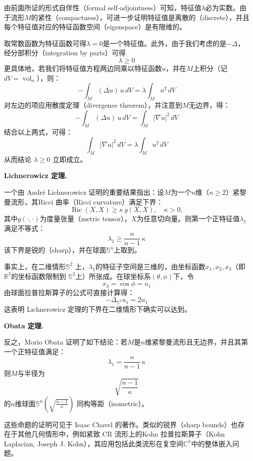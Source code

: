 由前面所证的形式自伴性（formal self-adjointness）可知，特征值$\lambda$必为实数。由于流形$M$的紧性（compactness），可进一步证明特征值是离散的（discrete），并且每个特征值对应的特征函数空间（eigenspace）是有限维的。

取常数函数为特征函数可得$\lambda = 0$是一个特征值。此外，由于我们考虑的是$-\Delta$，经分部积分（integration by parts）可得
\[
\lambda \ge 0~
\]
更具体地，若我们将特征值方程两边同乘以特征函数$u$，并在$M$上积分（记$dV = \operatorname{vol}_{n}$），则：
\[
-\int_{M} (\Delta u)\, u\, dV = \lambda \int_{M} u^{2}\, dV~
\]
对左边的项应用散度定理（divergence theorem），并注意到$M$无边界，得：
\[
-\int_{M} (\Delta u)\, u\, dV = \int_{M} |\nabla u|^{2}\, dV~
\]
结合以上两式，可得：
\[
\int_{M} |\nabla u|^{2}\, dV = \lambda \int_{M} u^{2}\, dV~
\]
从而结论 $\lambda \ge 0$ 立即成立。

\textbf{Lichnerowicz 定理.}

一个由 André Lichnerowicz 证明的重要结果指出：设$M$为一个$n$维（$n \ge 2$）紧黎曼流形，其Ricci 曲率（Ricci curvature）满足下界：
\[
\operatorname{Ric}(X, X) \ge \kappa\, g(X, X), \quad \kappa > 0,~
\]
其中$g(\cdot, \cdot)$为度量张量（metric tensor），$X$为任意切向量。则第一个正特征值$\lambda_{1}$满足不等式：
\[
\lambda_{1} \ge \frac{n}{n-1}\, \kappa~
\]
该下界是锐的（sharp），并在球面$\mathbb{S}^{n}$上取到。

事实上，在二维情形$\mathbb{S}^{2}$ 上，$\lambda_{1}$的特征子空间是三维的，由坐标函数$x_{1}, x_{2}, x_{3}$（即$\mathbb{R}^{3}$的坐标函数限制到 $\mathbb{S}^{2}$上）所张成。在球坐标系$(\theta, \phi)$下，令
\[
x_{3} = \cos \phi = u_{1}~
\]
由球面拉普拉斯算子的公式可直接计算得：
\[
-\Delta_{\mathbb{S}^{2}} u_{1} = 2u_{1}~
\]
这表明 Lichnerowicz 定理的下界在二维情形下确实可以达到。

\textbf{Obata 定理.}

反之，Morio Obata 证明了如下结论：若$M$是$n$维紧黎曼流形且无边界，并且其第一个正特征值满足：
\[
\lambda_{1} = \frac{n}{n-1}\, \kappa~
\]
则$M$与半径为
\[
\sqrt{\frac{n-1}{\kappa}}~
\]
的$n$维球面$\mathbb{S}^{n}\!\left(\sqrt{\frac{n-1}{\kappa}}\right)$ 同构等距（isometric）。

这些命题的证明可见于 Isaac Chavel 的著作。类似的锐界（sharp bounds）也存在于其他几何情形中，例如紧致 CR 流形上的Kohn 拉普拉斯算子（Kohn Laplacian, Joseph J. Kohn），其应用包括此类流形在复空间$\mathbb{C}^{n}$中的整体嵌入问题。
